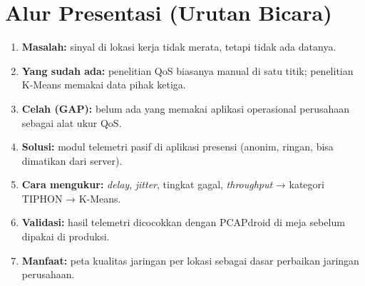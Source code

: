 \documentclass[11pt,a4paper]{article}
\begin{document}
\section{Alur Presentasi (Urutan Bicara)}
\begin{enumerate}
\item \textbf{Masalah:} sinyal di lokasi kerja tidak merata, tetapi tidak ada datanya.
\item \textbf{Yang sudah ada:} penelitian QoS biasanya manual di satu titik; penelitian K-Means memakai data pihak ketiga.
\item \textbf{Celah (GAP):} belum ada yang memakai aplikasi operasional perusahaan sebagai alat ukur QoS.
\item \textbf{Solusi:} modul telemetri pasif di aplikasi presensi (anonim, ringan, bisa dimatikan dari server).
\item \textbf{Cara mengukur:} \textit{delay}, \textit{jitter}, tingkat gagal, \textit{throughput} → kategori TIPHON → K-Means.
\item \textbf{Validasi:} hasil telemetri dicocokkan dengan PCAPdroid di meja sebelum dipakai di produksi.
\item \textbf{Manfaat:} peta kualitas jaringan per lokasi sebagai dasar perbaikan jaringan perusahaan.
\end{enumerate}

\end{document}
